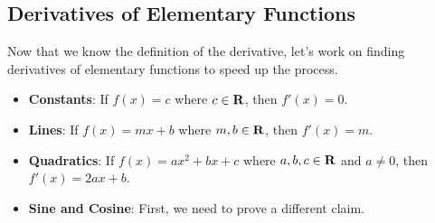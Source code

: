 \subsection{Derivatives of Elementary Functions}
Now that we know the definition of the derivative, let's work on finding
derivatives of elementary functions to speed up the process.
\begin{itemize}
    \item \textbf{Constants}: If $ f(x)=c $ where $ c\in\mathbf{R} $, then $ f'(x)=0 $.
    \item \textbf{Lines}: If $ f(x)=mx+b $ where $ m,b\in\mathbf{R} $, then $ f'(x)=m $.
    \item \textbf{Quadratics}: If $ f(x)=ax^2+bx+c $ where $ a,b,c\in\mathbf{R} $ and $ a\ne 0 $, then $ f'(x)=2ax+b $.
    \item \textbf{Sine and Cosine}: First, we need to prove a different claim.


\end{itemize}
